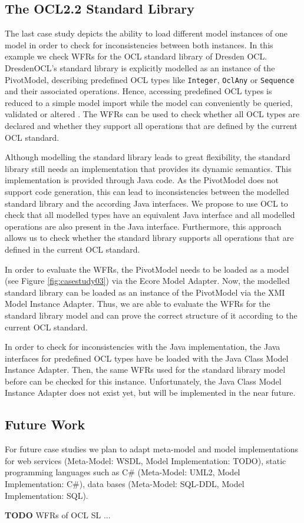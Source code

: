 \subsection{The OCL2.2 Standard Library}
The last case study depicts the ability to load different model instances of one model 
in order to check for inconsistencies between both instances. In this example we 
check WFRs for the OCL standard library of Dresden OCL. 
DresdenOCL's standard library is explicitly modelled as 
an instance of the PivotModel, describing predefined OCL types like \texttt{Integer}, 
\texttt{OclAny} or \texttt{Sequence} and their associated operations. 
Hence, accessing predefined OCL types is reduced to a simple model 
import while the model can conveniently be queried, validated or altered 
\cite{braeuerOCL07}. The WFRs can be used to check whether all OCL types are 
declared and whether they support all operations that are defined by the 
current OCL standard.

Although modelling the standard library leads to great flexibility, the standard library 
still needs an implementation that provides its dynamic semantics. 
This implementation is provided through Java code. As the PivotModel 
does not support code generation, this can lead to inconsistencies between 
the modelled standard library and the according Java interfaces.
We propose to use OCL to check that all modelled types have an equivalent Java 
interface and all modelled operations are also present in the Java interface. Furthermore, 
this approach allows us to check whether the standard library supports all operations that 
are defined in the current OCL standard.

In order to evaluate the WFRs, the PivotModel needs to be loaded as a model (see Figure 
\ref{fig:casestudy03}) via the Ecore Model Adapter. Now, the modelled standard library 
can be loaded as an instance of the PivotModel via the XMI Model Instance Adapter. Thus, 
we are able to evaluate the WFRs for the standard library model and can prove the correct 
structure of it according to the current OCL standard. 

In order to check for inconsistencies with the Java implementation, the Java interfaces 
for predefined OCL types have be loaded with the Java Class Model Instance Adapter. Then, the same WFRs 
used for the standard library model before can be checked for this instance. 
Unfortunately, the Java Class Model Instance Adapter does not exist yet, but will be 
implemented in the near future.


\subsection{Future Work}

For future case studies we plan to adapt meta-model and model implementations for web services (Meta-Model: WSDL, Model Implementation: TODO), static programming languages such as C\# (Meta-Model: UML2, Model Implementation: C\#), data bases (Meta-Model: SQL-DDL, Model Implementation: SQL). 

\textbf{TODO} WFRs of OCL SL ...

